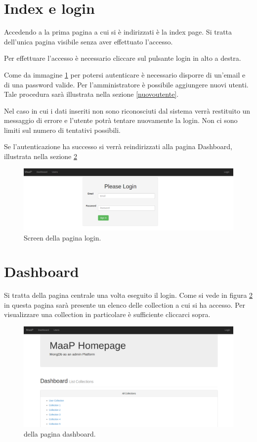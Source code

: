 \section{Index e login}

Accedendo a \ProjectName{} la prima pagina a cui si è indirizzati è la index page.
Si tratta dell'unica pagina visibile senza aver effettuato l'accesso.

Per effettuare l'accesso è necessario cliccare sul pulsante login in alto a destra.

Come da immagine \ref{loginfig} per potersi autenticare è necessario disporre di un'email e di una password valide.
Per l'amministratore è possibile aggiungere nuovi utenti. Tale procedura sarà illustrata nella sezione \ref{nuovoutente}.

Nel caso in cui i dati inseriti non sono riconosciuti dal sistema verrà restituito un messaggio di errore e l'utente potrà tentare nuovamente la login. Non ci sono limiti sul numero di tentativi possibili.

Se l'autenticazione ha successo si verrà reindirizzati alla pagina Dashboard, illustrata nella sezione \ref{dashboard}
\begin{figure}[h]
	\label{loginfig}
	\centering \includegraphics[width=1\textwidth]{login.png}
	\caption{Screen della pagina login.}
\end{figure}

\section{Dashboard}
 \label{dashboard}
 
Si tratta della pagina centrale una volta eseguito il login. Come si vede in figura \ref{dashboardfig} in questa pagina sarà presente un elenco delle collection a cui si ha accesso. Per visualizzare una collection in particolare è sufficiente cliccarci sopra.

\begin{figure}[h]
	\label{dashboardfig}
	\centering \includegraphics[width=1\textwidth]{dashboard.png}
	\caption{della pagina dashboard. }
\end{figure}

